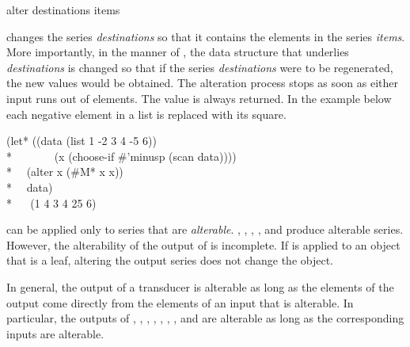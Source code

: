 \begin{defun}[Function]
alter destinations items

 changes the series \emph{destinations} so that it contains
the elements in the series \emph{items}.  More importantly, in the
manner of , the data structure that underlies {\it
destinations} is changed so that if the series \emph{destinations} were
to be regenerated, the new values would be obtained.  The alteration
process stops as soon as either input runs out of elements.  The value
 is always returned. In the example below each negative element in
a list is replaced with its square.
\begin{lisp}
(let* ((data (list 1 -2 3 4 -5 6)) \\*
~~~~~~~(x (choose-if \#'minusp (scan data)))) \\*
~~(alter x (\#M* x x)) \\*
~~data) \\*
~~{\EV} (1 4 3 4 25 6)
\end{lisp}

 can be applied only to series that are \emph{alterable}.  
, , , , and
 produce alterable series.  
However, the alterability of
the output of
is incomplete.  If
is applied to an object that is a leaf,
altering the output series does not change the object.

In general, the output of a transducer is alterable as long as the elements
of the output come directly from the elements of an input that is
alterable.  In particular, the outputs of , ,
, , , , ,
and  are alterable as long as the corresponding inputs are
alterable.
\end{defun}


